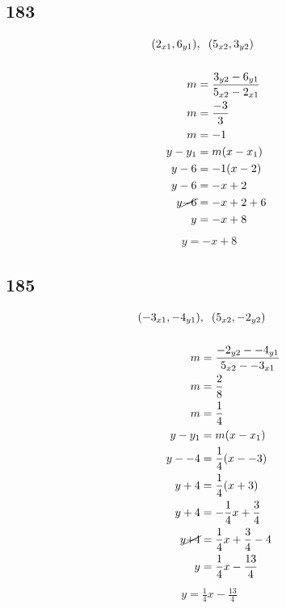 \documentclass{article}
\begin{document}
    \subsection*{183}
    \begin{align*}
    (2_{x1}, 6_{y1})&,\hspace{.2cm} (5_{x2}, 3_{y2}) \\
    \\
    m &= \frac{3_{y2} -  6_{y1}}{5_{x2} - 2_{x1}} \\
    m &= \frac{-3}{3} \\
    m &= -1\\
    y - y_{1} &= m(x - x_{1})\\
    y - 6 &= -1(x - 2) \\
    y - 6 &= -x + 2\\
    y \cancel{-6} &= -x + 2 + 6\\
    y &= -x + 8
    \end{align*}
    \begin{align*}
        \boxed{y = -x + 8}
    \end{align*}

    \subsection*{185}
    \begin{align*}
    (-3_{x1}, -4_{y1})&,\hspace{.2cm} (5_{x2}, -2_{y2}) \\
    \\
    m &= \frac{-2_{y2} -  -4_{y1}}{5_{x2} - -3_{x1}} \\
    m &= \frac{2}{8} \\
    m &= \frac{1}{4}\\
    y - y_{1} &= m(x - x_{1})\\
    y - -4 &= \frac{1}{4}(x - -3) \\
    y + 4 &= \frac{1}{4}(x +3) \\
    y +4 &= -\frac{1}{4}x + \frac{3}{4}\\
    y \cancel{+4} &= \frac{1}{4}x + \frac{3}{4} - 4\\
    y &= \frac{1}{4}x -\frac{13}{4}
    \end{align*}
    \begin{align*}
        \boxed{y = \frac{1}{4}x -\frac{13}{4}}
    \end{align*}
\end{document}
